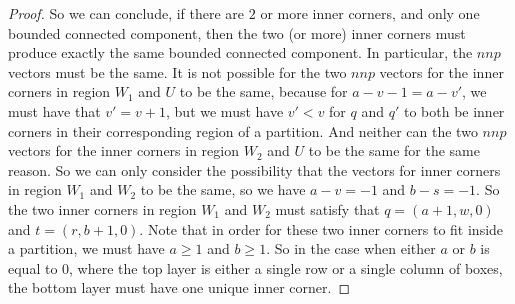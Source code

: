 \documentclass{amsart}[10pt]
\theoremstyle{plain}
\theoremstyle{definition}
\begin{document}
\begin{proof}
So we can conclude, if there are $2$ or more inner corners, and only one bounded connected component, then the two (or more) inner corners must produce exactly the same bounded connected component. In particular, the $nnp$ vectors must be the same. It is not possible for the two $nnp$ vectors for the inner corners in region $W_1$ and $U$ to be the same, because for $a-v-1=a-v'$, we must have that $v'=v+1$, but we must have $v'<v$ for $q$ and $q'$ to both be inner corners in their corresponding region of a partition. And neither can the two $nnp$ vectors for the inner corners in region $W_2$ and $U$ to be the same for the same reason. So we can only consider the possibility that the vectors for inner corners in region $W_1$ and $W_2$ to be the same, so we have $a-v=-1$ and $b-s=-1$. So the two inner corners in region $W_1$ and $W_2$ must satisfy that $q=(a+1, w, 0)$ and $t=(r, b+1, 0)$. Note that in order for these two inner corners to fit inside a partition, we must have $a \geq 1$ and $b \geq 1$. So in the case when either $a$ or $b$ is equal to $0$, where the top layer is either a single row or a single column of boxes, the bottom layer must have one unique inner corner.
\end{proof}
\end{document}
